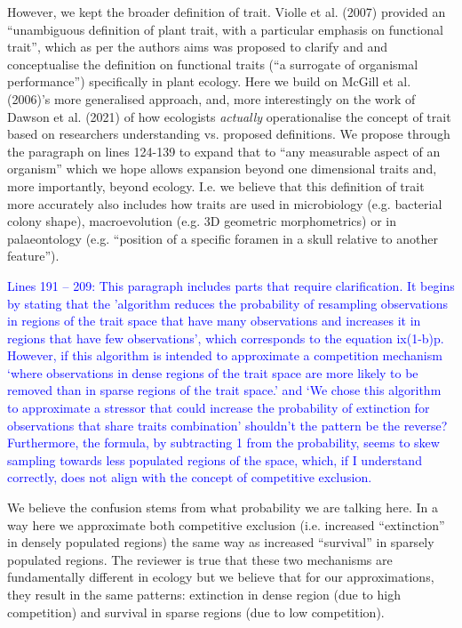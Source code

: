 \documentclass[
]{article}
\begin{document}
However, we kept the broader definition of trait.
Violle et al. (2007) provided an ``unambiguous definition of plant trait, with a particular emphasis on functional trait'', which as per the authors aims was proposed to clarify and and conceptualise the definition on functional traits (``a surrogate of organismal performance'') specifically in plant ecology.
Here we build on McGill et al. (2006)'s more generalised approach, and, more interestingly on the work of Dawson et al. (2021) of how ecologists \textit{actually} operationalise the concept of trait based on researchers understanding vs. proposed definitions.
We propose through the paragraph on lines 124-139 to expand that to ``any measurable aspect of an organism'' which we hope allows expansion beyond one dimensional traits and, more importantly, beyond ecology.
I.e. we believe that this definition of trait more accurately also includes how traits are used in microbiology (e.g. bacterial colony shape), macroevolution (e.g. 3D geometric morphometrics) or in palaeontology (e.g. ``position of a specific foramen in a skull relative to another feature'').
 
\textcolor{blue}{Lines 191 – 209: This paragraph includes parts that require clarification.
It begins by stating that the 'algorithm reduces the probability of resampling observations in regions of the trait space that have many observations and increases it in regions that have few observations', which corresponds to the equation ix(1-b)p.
However, if this algorithm is intended to approximate a competition mechanism ‘where observations in dense regions of the trait space are more likely to be removed than in sparse regions of the trait space.’ and ‘We chose this algorithm to approximate a stressor that could increase the probability of extinction for observations that share traits combination’ shouldn’t the pattern be the reverse?
Furthermore, the formula, by subtracting 1 from the probability, seems to skew sampling towards less populated regions of the space, which, if I understand correctly, does not align with the concept of competitive exclusion.}

We believe the confusion stems from what probability we are talking here.
In a way here we approximate both competitive exclusion (i.e. increased ``extinction'' in densely populated regions) the same way as increased ``survival'' in sparsely populated regions.
The reviewer is true that these two mechanisms are fundamentally different in ecology but we believe that for our approximations, they result in the same patterns: extinction in dense region (due to high competition) and survival in sparse regions (due to low competition).
\end{document}
